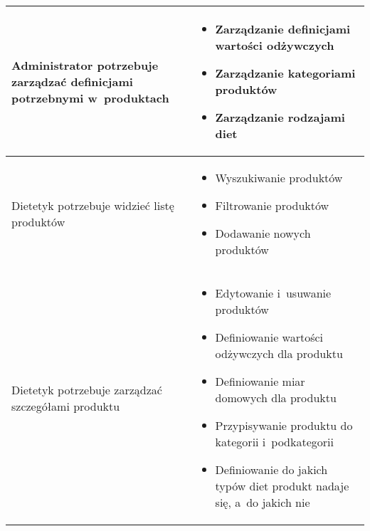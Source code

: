 \begin{minipage}{\textwidth}
\begin{table}[H]
\begin{tabular}{|P{.3\textwidth}|P{.6\textwidth}|}
            \hline
            Administrator potrzebuje zarządzać definicjami potrzebnymi w~produktach &
            \begin{itemize}
                \item Zarządzanie definicjami wartości odżywczych
                \item Zarządzanie kategoriami produktów
                \item Zarządzanie rodzajami diet
            \end{itemize} \\
            \hline
            Dietetyk potrzebuje widzieć listę produktów &
            \begin{itemize}
                \item Wyszukiwanie produktów
                \item Filtrowanie produktów
                \item Dodawanie nowych produktów
            \end{itemize} \\
            \hline
            Dietetyk potrzebuje zarządzać szczegółami produktu &
            \begin{itemize}
                \item Edytowanie i~usuwanie produktów
                \item Definiowanie wartości odżywczych dla produktu
                \item Definiowanie miar domowych dla produktu
                \item Przypisywanie produktu do kategorii i~podkategorii
                \item Definiowanie do jakich typów diet produkt nadaje się, a~do jakich nie
            \end{itemize} \\
            \hline
        \end{tabular}
    \end{table}
\end{minipage}

